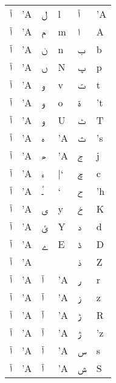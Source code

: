 \documentclass{article}
\begin{document}
\section*{\huge{}}

\Large
\begin{center}
\begin{xtabular}{>{\raggedleft\arraybackslash}p{0.13\textwidth}|p{0.13\textwidth}
				 >{\raggedleft\arraybackslash}p{0.13\textwidth}|p{0.13\textwidth}
				 >{\raggedleft\arraybackslash}p{0.13\textwidth}|p{0.13\textwidth}}

\texturdu{آ}  & 'A  & \texturdu{ل}  & l   & \texturdu{آ}  & 'A  \\
\texturdu{آ}  & 'A  & \texturdu{م}  & m   & \texturdu{ا}  & A   \\
\texturdu{آ}  & 'A  & \texturdu{ن}  & n   & \texturdu{ب}  & b   \\
\texturdu{آ}  & 'A  & \texturdu{ں}  & N   & \texturdu{پ}  & p   \\
\texturdu{آ}  & 'A  & \texturdu{و}  & v   & \texturdu{ت}  & t   \\
\texturdu{آ}  & 'A  & \texturdu{و}  & o   & \texturdu{ة}  & 't  \\
\texturdu{آ}  & 'A  & \texturdu{و}  & U   & \texturdu{ٹ}  & T   \\
\texturdu{آ}  & 'A  & \texturdu{ہ}  & 'A  & \texturdu{ث}  & 's  \\
\texturdu{آ}  & 'A  & \texturdu{ھ}  & 'A  & \texturdu{ج}  & j   \\
\texturdu{آ}  & 'A  & \texturdu{ء}  & |`  & \texturdu{چ}  & c   \\
\texturdu{آ}  & 'A  & \texturdu{ـٔ}  & `   & \texturdu{ح}  & 'h  \\
\texturdu{آ}  & 'A  & \texturdu{ی}  & y   & \texturdu{خ}  & K   \\
\texturdu{آ}  & 'A  & \texturdu{ئ}  & Y   & \texturdu{د}  & d   \\
\texturdu{آ}  & 'A  & \texturdu{ے}  & E   & \texturdu{ڈ}  & D   \\
\texturdu{آ}  & 'A  & \texturdu{ }  &     & \texturdu{ذ}  & Z   \\
\texturdu{آ}  & 'A  & \texturdu{آ}  & 'A  & \texturdu{ر}  & r   \\
\texturdu{آ}  & 'A  & \texturdu{آ}  & 'A  & \texturdu{ز}  & z   \\
\texturdu{آ}  & 'A  & \texturdu{آ}  & 'A  & \texturdu{ڑ}  & R   \\
\texturdu{آ}  & 'A  & \texturdu{آ}  & 'A  & \texturdu{ژ}  & 'z  \\
\texturdu{آ}  & 'A  & \texturdu{آ}  & 'A  & \texturdu{س}  & s   \\
\texturdu{آ}  & 'A  & \texturdu{آ}  & 'A  & \texturdu{ش}  & S   \\


\end{xtabular}
\end{center}
\end{document}
